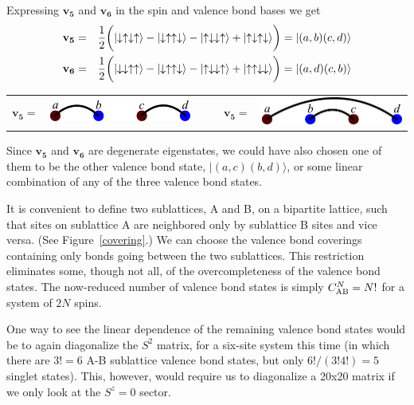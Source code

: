 Expressing $\mathbf{v_5}$ and $\mathbf{v_6}$ in the spin and valence bond bases we get
\begin{eqnarray}
\mathbf{v_5} &=&\frac{1}{2}\bigg(\lvert \downarrow \uparrow \downarrow \uparrow \rangle - \lvert \downarrow \uparrow \uparrow \downarrow \rangle
			- \lvert \uparrow \downarrow \downarrow \uparrow \rangle + \lvert \uparrow \downarrow \uparrow \downarrow \rangle \bigg) 
			= \lvert(a,b)(c,d)\rangle \label{state5}\\
\mathbf{v_6} &=&\frac{1}{2}\bigg(\lvert \downarrow \downarrow \uparrow \uparrow \rangle - \lvert \downarrow \uparrow \uparrow \downarrow \rangle
			- \lvert \uparrow \downarrow \downarrow \uparrow \rangle + \lvert \uparrow \uparrow \downarrow \downarrow \rangle \bigg)
			= \lvert(a,d)(c,b)\rangle \label{state6}
\end{eqnarray}
\begin{center}
\begin{tabular}{ccccc}
$\mathbf{v_5} =$ &  \includegraphics [width=2in]{./figures/made/state5.pdf} &\;\;\;\;\;\;\,\,\,\,\,\,
& $\mathbf{v_5} =$ &  \includegraphics [width=2in]{./figures/made/state6.pdf} 
\end{tabular}
\end{center}
Since $\mathbf{v_5}$ and  $\mathbf{v_6}$ are degenerate eigenstates, we could have also chosen one of them to be the other valence bond state, $\lvert(a,c)(b,d)\rangle$, or some linear combination of any of the three valence bond states.

It is convenient to define two sublattices, A and B, on a bipartite lattice, such that sites on 
sublattice A are neighbored only by sublattice B sites and vice versa. (See Figure~\ref{covering}.)
We can choose the valence bond coverings containing only bonds going between the two sublattices.
This restriction eliminates some, though not all, of the overcompleteness of the valence bond states.
The now-reduced number of valence bond states is simply $C_{\rm{AB}}^N = N!$ for a system of $2N$ spins.

One way to see the linear dependence of the remaining valence bond states would be to again diagonalize
the $S^2$ matrix, for a six-site system this time (in which there are $3!=6$ A-B sublattice
valence bond states, but only $6!/(3!4!) = 5$ singlet states).
This, however, would require us to diagonalize a 20x20 matrix if we only look at
the $S^z=0$ sector.

